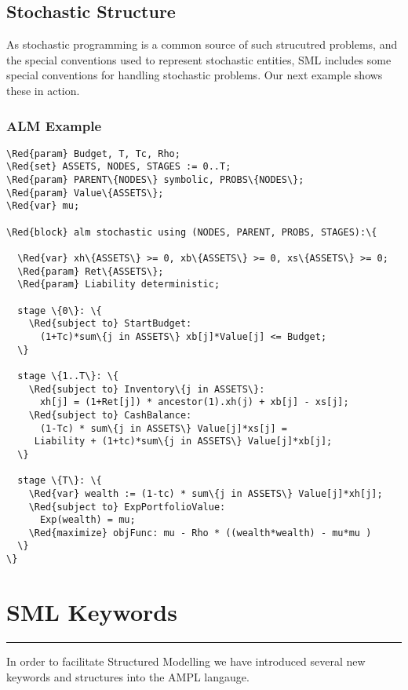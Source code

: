 \documentclass[10pt,a4paper]{book}
\begin{document}
\section{Stochastic Structure}

As stochastic programming is a common source of such strucutred problems, and
the special conventions used to represent stochastic entities, SML includes
some special conventions for handling stochastic problems. Our next example
shows these in action.

\subsection{ALM Example}

\begin{Verbatim}[frame=single,framerule=0.2pt,framesep=5pt,commandchars=\\\{\}]
\Red{param} Budget, T, Tc, Rho;
\Red{set} ASSETS, NODES, STAGES := 0..T;
\Red{param} PARENT\{NODES\} symbolic, PROBS\{NODES\};
\Red{param} Value\{ASSETS\};
\Red{var} mu;

\Red{block} alm stochastic using (NODES, PARENT, PROBS, STAGES):\{

  \Red{var} xh\{ASSETS\} >= 0, xb\{ASSETS\} >= 0, xs\{ASSETS\} >= 0;
  \Red{param} Ret\{ASSETS\};
  \Red{param} Liability deterministic;

  stage \{0\}: \{
    \Red{subject to} StartBudget:
      (1+Tc)*sum\{j in ASSETS\} xb[j]*Value[j] <= Budget;
  \}

  stage \{1..T\}: \{
    \Red{subject to} Inventory\{j in ASSETS\}:
      xh[j] = (1+Ret[j]) * ancestor(1).xh(j) + xb[j] - xs[j];
    \Red{subject to} CashBalance:
      (1-Tc) * sum\{j in ASSETS\} Value[j]*xs[j] = 
	 Liability + (1+tc)*sum\{j in ASSETS\} Value[j]*xb[j];
  \}

  stage \{T\}: \{
    \Red{var} wealth := (1-tc) * sum\{j in ASSETS\} Value[j]*xh[j];
    \Red{subject to} ExpPortfolioValue:
      Exp(wealth) = mu;
    \Red{maximize} objFunc: mu - Rho * ((wealth*wealth) - mu*mu )
  \}
\}
\end{Verbatim}

\chapter{SML Keywords}
\vspace{-0.6cm}\rule{\textwidth}{0.4ex}\vspace{0.1cm}
In order to facilitate Structured Modelling we have introduced several new
keywords and structures into the AMPL langauge.
\end{document}
